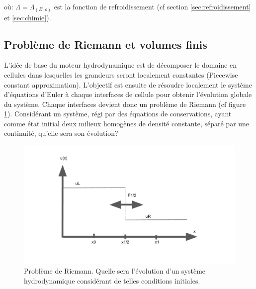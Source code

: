 où: $\Lambda = \Lambda_{(E,\rho)}$ est la fonction de refroidissement (cf section \ref{sec:refroidissement} et \ref{sec:chimie}).

\subsection{Problème de Riemann et volumes finis}

L'idée de base du moteur hydrodynamique est de décomposer le domaine en cellules dans lesquelles les grandeurs seront localement constantes (Piecewise constant approximation).
L'objectif est ensuite de résoudre localement le système d'équations d'Euler à chaque interfaces de cellule pour obtenir l'évolution globale du système.
Chaque interfaces devient donc un problème de Riemann (cf figure \ref{fig:riemann}).
Considérant un système, régi par des équations de conservations, ayant comme état initial deux milieux homogènes de densité constante, séparé par une continuité, qu'elle sera son évolution?


\begin{figure}
        \includegraphics[width=.95\linewidth]{img/02/riemann.pdf} 
        \caption[Problème de Riemann]{Problème de Riemann. Quelle sera l'évolution d'un système hydrodynamique considérant de telles conditions initiales.  
 		\label{fig:riemann}
 		}
\end{figure}

